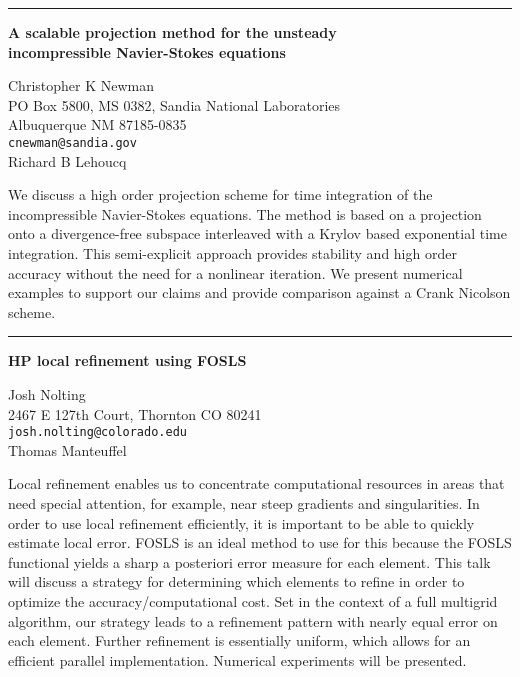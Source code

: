 \documentclass[twosided]{report}
\begin{document}
	\begin{center} \rule{6in}{1pt} \end{center}

\begin{center}
{\large			%
{\bf A scalable projection method for the unsteady \\
	incompressible Navier-Stokes equations}}

	Christopher K Newman \\
	PO Box 5800, MS 0382, Sandia National Laboratories \\
	Albuquerque NM 87185-0835 \\
	{\tt cnewman@sandia.gov} \\
	Richard B Lehoucq
\end{center}
We discuss a high order projection scheme for time
integration of the incompressible Navier-Stokes equations.
The method is based on a projection onto a divergence-free
subspace interleaved with a Krylov based exponential time
integration. This semi-explicit approach provides stability
and high order accuracy without the need for a nonlinear
iteration. We present numerical examples to support our
claims and provide comparison against a Crank Nicolson
scheme.



	\begin{center} \rule{6in}{1pt} \end{center}

\begin{center}
{\large			%
{\bf HP local refinement using FOSLS}}

	Josh Nolting \\
	2467 E 127th Court,  Thornton CO 80241 \\
	{\tt josh.nolting@colorado.edu} \\
	Thomas Manteuffel
\end{center}
Local refinement enables us to concentrate computational
resources in areas that need special attention, for example,
near steep gradients and singularities. In order to use
local refinement efficiently, it is important to be able to
quickly estimate local error. FOSLS is an ideal method to
use for this because the FOSLS functional yields a sharp a
posteriori error measure for each element. This talk will
discuss a strategy for determining which elements to refine
in order to optimize the accuracy/computational cost. Set in
the context of a full multigrid algorithm, our strategy
leads to a refinement pattern with nearly equal error on
each element. Further refinement is essentially uniform,
which allows for an efficient parallel implementation.
Numerical experiments will be presented.
\end{document}
